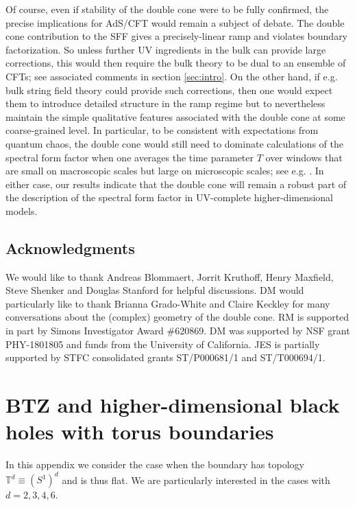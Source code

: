 \documentclass[11pt]{article}
\begin{document}
Of course, even if stability of the double cone were to be fully confirmed, the precise implications for AdS/CFT would remain a subject of debate.
The double cone contribution to the SFF gives a precisely-linear ramp and violates boundary factorization.
So unless further UV ingredients in the bulk can provide large corrections, this would then require the bulk theory to be dual to an ensemble of CFTs; see associated comments in section \ref{sec:intro}.
On the other hand, if e.g. bulk string field theory could provide such corrections, then one would expect them to introduce detailed structure in the ramp regime but to nevertheless maintain the simple qualitative features associated with the double cone at some coarse-grained level.
In particular, to be consistent with expectations from quantum chaos, the double cone would still need to dominate calculations of the spectral form factor when one averages the time parameter $T$ over windows that are small on macroscopic scales but large on microscopic scales; see e.g. \cite{SaadTalk}. 
In either case, our results indicate that the double cone will remain a robust part of the description of the spectral form factor in UV-complete higher-dimensional models.



\subsection*{Acknowledgments}
We would like to thank Andreas Blommaert, Jorrit Kruthoff, Henry Maxfield, Steve Shenker and Douglas Stanford for helpful discussions.  
DM would particularly like to thank Brianna Grado-White and Claire Keckley for many conversations about the (complex) geometry of the double cone.
RM is supported in part by Simons Investigator Award \#620869.
DM was supported by NSF grant PHY-1801805 and funds from the University of California.
JES is partially supported by STFC consolidated grants ST/P000681/1 and ST/T000694/1.







\appendix
\section{\label{app:btz}BTZ and higher-dimensional black holes with torus boundaries}
In this appendix we consider the case when the boundary has topology $\mathbb{T}^d\equiv (S^1)^d$ and is thus flat. We are particularly interested in the cases with $d=2,3,4,6$.
\end{document}
